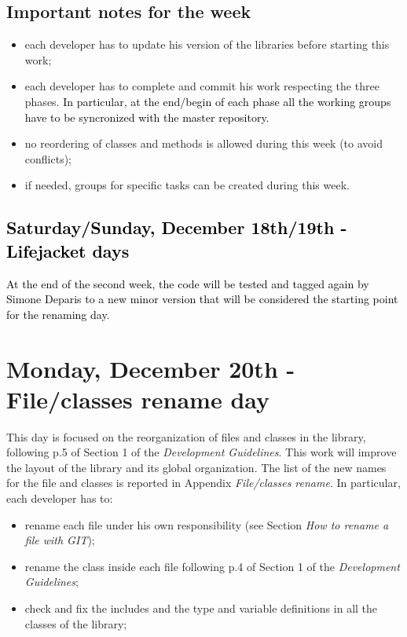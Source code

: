 \documentclass[10p]{article}
\newcommand{\newparts}[1]{\textcolor{black}{#1}}
\newcommand{\newpartsVC}[1]{\textcolor{black}{#1}}
\theoremstyle{definition}
\begin{document}
\subsection*{Important notes for the week}
\begin{itemize}
  \item each developer has to update his version of the libraries before starting this work;
  \item each developer has to complete and commit his work respecting the three phases. \newpartsVC{In particular, at the end/begin of each phase all the working groups have to be syncronized with the master repository.} 
  \item no reordering of classes and methods is allowed during this week (to avoid conflicts);
  \item if needed, groups for specific tasks can be created during this week.
\end{itemize}




\newparts{
\section*{Saturday/Sunday, December 18th/19th - Lifejacket days}
At the end of the second week, the code will be tested and tagged again by Simone Deparis to a new minor version that will be considered the starting point for the renaming day.
}



\section*{Monday, December 20th - File/classes rename day}
This day is focused on the reorganization of files and classes in the library, following p.5 of Section 1 of the \emph{Development Guidelines}. This work will improve the layout of the library and its global organization. The list of the new names for the file and classes is reported in Appendix \emph{File/classes rename}. In particular, each developer has to:
\begin{itemize}
  \item rename each file under his own responsibility (see Section \emph{How to rename a file with GIT});
  \item rename the class inside each file following p.4 of Section 1 of the \emph{Development Guidelines};
  \item check and fix the includes and the type and variable definitions in all the classes of the library;
\end{itemize}
\end{document}
